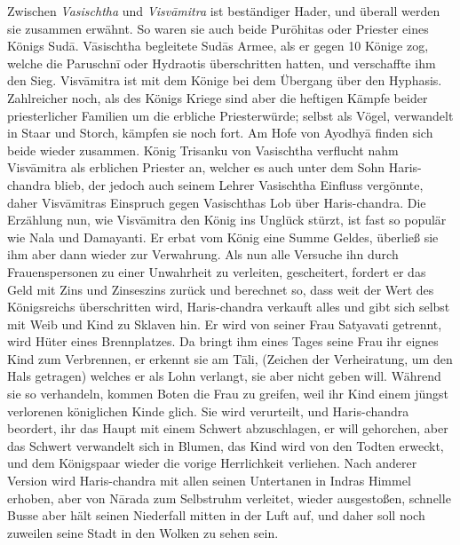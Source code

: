 \documentclass{article}
\begin{document}
Zwischen \emph{Vasischtha} und \emph{Visv\={a}mitra} ist beständiger Hader, und überall werden sie zusammen erwähnt. So waren sie auch beide Pur\={o}hitas oder Priester eines Königs Sud\={a}. V\={a}sischtha begleitete Sud\={a}s Armee, als er gegen 10 Könige zog, welche die Paruschn\={i} oder Hydraotis überschritten hatten, und verschaffte ihm den Sieg. Visv\={a}mitra ist mit dem Könige bei dem Übergang über den Hyphasis. Zahlreicher noch, als des Königs Kriege sind aber die heftigen Kämpfe beider priesterlicher Familien um die erbliche Priesterwürde; selbst als Vögel, verwandelt in Staar und Storch, kämpfen sie noch fort. Am Hofe von Ayodhy\={a} finden sich beide wieder zusammen. König Trisanku von Vasischtha verflucht nahm Visv\={a}mitra als erblichen Priester an, welcher es auch unter dem Sohn Haris-chandra blieb, der jedoch auch seinem Lehrer Vasischtha Einfluss vergönnte, daher Visv\={a}mitras Einspruch gegen Vasischthas Lob über Haris-chandra. Die Erzählung nun, wie Visv\={a}mitra den König ins Unglück stürzt, ist fast so populär wie Nala und Damayanti. Er erbat vom König eine Summe Geldes, überließ sie ihm aber dann wieder zur Verwahrung. Als nun alle Versuche ihn durch Frauenspersonen zu einer Unwahrheit zu verleiten, gescheitert, fordert er das Geld mit Zins und Zinseszins zurück und berechnet so, dass weit der Wert des Königsreichs überschritten wird, Haris-chandra verkauft alles und gibt sich selbst mit Weib und Kind zu Sklaven hin. Er wird von seiner Frau Satyavati getrennt, wird Hüter eines Brennplatzes. Da bringt ihm eines Tages seine Frau ihr eignes Kind zum Verbrennen, er erkennt sie am T\={a}li, (Zeichen der Verheiratung, um den Hals getragen) welches er als Lohn verlangt, sie aber nicht geben will. Während sie so verhandeln, kommen Boten die Frau zu greifen, weil ihr Kind einem jüngst verlorenen königlichen Kinde glich. Sie wird verurteilt, und Haris-chandra beordert, ihr das Haupt mit einem Schwert abzuschlagen, er will gehorchen, aber das Schwert verwandelt sich in Blumen, das Kind wird von den Todten erweckt, und dem Königspaar wieder die vorige Herrlichkeit verliehen. Nach anderer Version wird Haris-chandra mit allen seinen Untertanen in Indras Himmel erhoben, aber von N\={a}rada zum Selbstruhm verleitet, wieder ausgestoßen, schnelle Busse aber hält seinen Niederfall mitten in der Luft auf, und daher soll noch zuweilen seine Stadt in den Wolken zu sehen sein.
\end{document}
